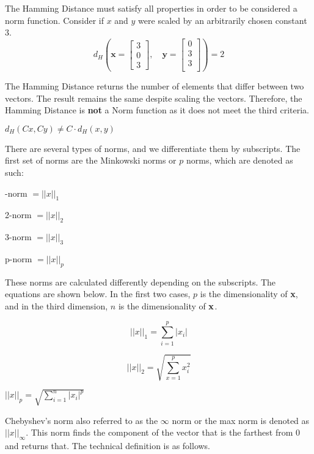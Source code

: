 The Hamming Distance must satisfy all properties in order to be considered a norm function. Consider if $x$ and $y$ were scaled by an arbitrarily chosen constant $3$.
\[
d_H \left( \mathbf{{x}} = 
\begin{bmatrix}
    3 \\
    0 \\
    3 
\end{bmatrix}, 
\quad
\mathbf{{y}} = 
\begin{bmatrix}
    0 \\
    3 \\
    3 \\
\end{bmatrix} \right) = 2
\]

The Hamming Distance returns the number of elements that differ between two vectors. The result remains the same despite scaling the vectors. Therefore, the Hamming Distance is \textbf{not} a Norm function as it does not meet the third criteria.

\centering
$d_{H}(Cx,Cy) \ne C \cdot d_{H}(x,y)$

\raggedright

There are several types of norms, and we differentiate them by subscripts. The first set of norms are the Minkowski norms or $p$ norms, which are denoted as such:

-norm $= ||x||_1$

2-norm $= ||x||_2$

3-norm $= ||x||_3$

p-norm $= ||x||_p$

\raggedright

These norms are calculated differently depending on the subscripts. The equations are shown below. In the first two cases, $p$ is the dimensionality of {\bf x}, and in the third dimension, $n$ is the dimensionality of ${\bf x}$.

\centering
$$||x||_1 = \sum_{i=1}^{p}|x_i|$$

$$||x||_2 = \sqrt{\sum_{x=1}^{p}x_i^2}$$

$||x||_p = \sqrt{\sum_{i=1}^{n}|x_i|^p}$

\raggedright

Chebyshev's norm also referred to as the $\infty$ norm or the max norm is denoted as $||x||_\infty$. This norm finds the component of the vector that is the farthest from 0 and returns that. The technical definition is as follows.

